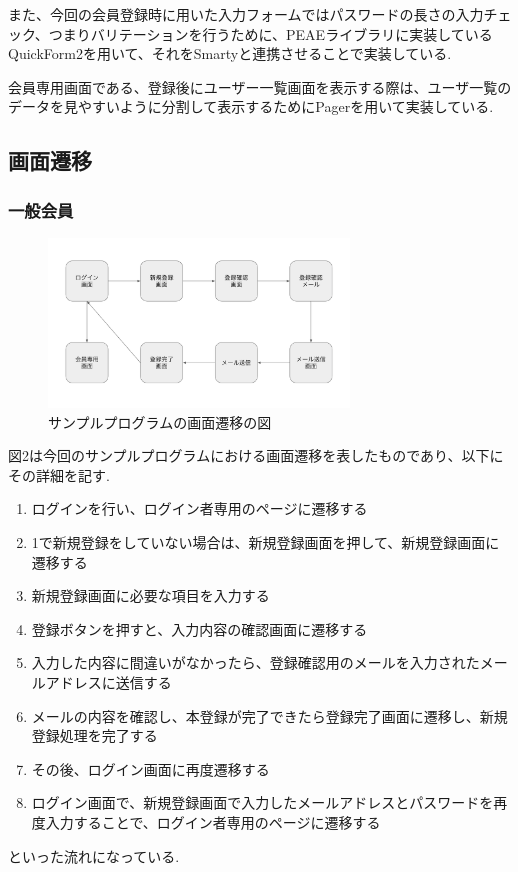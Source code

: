 \documentclass[submit,techrep]{ipsj}
\begin{document}
また、今回の会員登録時に用いた入力フォームではパスワードの長さの入力チェック、つまりバリテーションを行うために、PEAEライブラリに実装しているQuickForm2を用いて、それをSmartyと連携させることで実装している.

会員専用画面である、登録後にユーザー一覧画面を表示する際は、ユーザ一覧のデータを見やすいように分割して表示するためにPagerを用いて実装している.


\subsection{画面遷移}
\subsubsection{一般会員}
\begin{figure}[htbp]
  \centering
 \includegraphics[width=8cm]{./images/screen_transition.jpg}
  \caption{サンプルプログラムの画面遷移の図}
  \label{fig:sample}
\end{figure}

図2は今回のサンプルプログラムにおける画面遷移を表したものであり、以下にその詳細を記す.

\begin{enumerate}
  \item ログインを行い、ログイン者専用のページに遷移する
  \item 1で新規登録をしていない場合は、新規登録画面を押して、新規登録画面に遷移する
  \item  新規登録画面に必要な項目を入力する
  \item  登録ボタンを押すと、入力内容の確認画面に遷移する
  \item  入力した内容に間違いがなかったら、登録確認用のメールを入力されたメールアドレスに送信する
  \item メールの内容を確認し、本登録が完了できたら登録完了画面に遷移し、新規登録処理を完了する
  \item  その後、ログイン画面に再度遷移する
  \item ログイン画面で、新規登録画面で入力したメールアドレスとパスワードを再度入力することで、ログイン者専用のページに遷移する
  \end{enumerate}
といった流れになっている.
\end{document}
